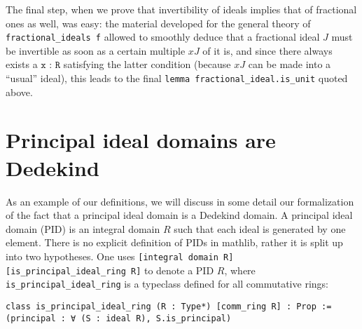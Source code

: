 \documentclass[a4paper,USenglish,cleveref, autoref, thm-restate]{lipics-v2021}
\newcommand{\lean}[1]{\texttt{#1}\xspace} %
\newcommand{\mathlib}{\textsf{mathlib}\xspace}
\begin{document}
The final step, when we prove that invertibility of ideals implies that of fractional ones as well, was easy: the material developed for the general theory of \lean{fractional\_ideals f} allowed to smoothly deduce that a fractional ideal $J$ must be invertible as soon as a certain multiple $xJ$ of it is, and since there always exists a $\lean{x : R}$ satisfying the latter condition (because $xJ$ can be made into a ``usual'' ideal), this leads to the final \lean{lemma fractional\_ideal.is\_unit} quoted above.
%
\section{Principal ideal domains are Dedekind}

As an example of our definitions, we will discuss in some detail our formalization of the fact that a principal ideal domain is a Dedekind domain.
A principal ideal domain (PID) is an integral domain $R$ such that each ideal is generated by one element.
There is no explicit definition of PIDs in \mathlib, rather it is split up into two hypotheses.
One uses \lean{[integral domain R] [is\_principal\_ideal\_ring R]} to denote a PID $R$,
where \lean{is\_principal\_ideal\_ring} is a typeclass defined for all commutative rings:
\begin{lstlisting}
class is_principal_ideal_ring (R : Type*) [comm_ring R] : Prop :=
(principal : ∀ (S : ideal R), S.is_principal)
\end{lstlisting}
\end{document}
